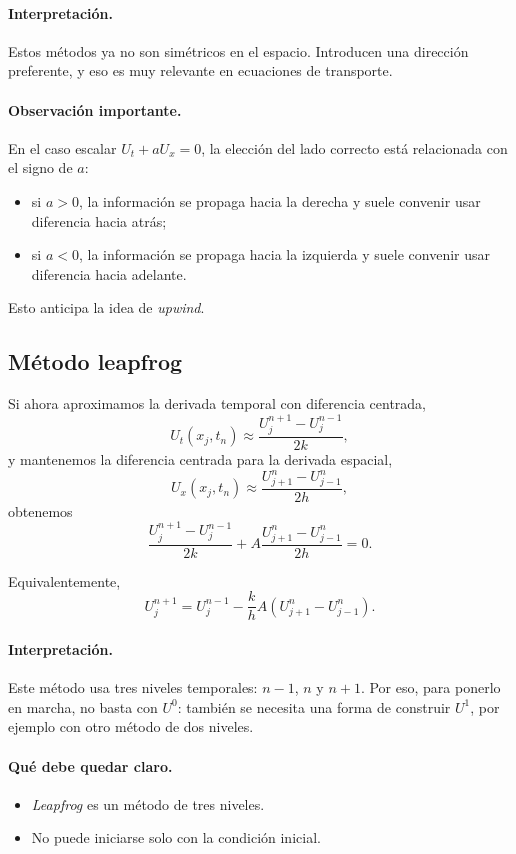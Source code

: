 \paragraph{Interpretación.}
Estos métodos ya no son simétricos en el espacio. Introducen una dirección preferente, y eso es muy relevante en ecuaciones de transporte.

\paragraph{Observación importante.}
En el caso escalar \(U_t+aU_x=0\), la elección del lado correcto está relacionada con el signo de \(a\):
\begin{itemize}
    \item si \(a>0\), la información se propaga hacia la derecha y suele convenir usar diferencia hacia atrás;
    \item si \(a<0\), la información se propaga hacia la izquierda y suele convenir usar diferencia hacia adelante.
\end{itemize}
Esto anticipa la idea de \emph{upwind}.

\subsection{Método leapfrog}

Si ahora aproximamos la derivada temporal con diferencia centrada,
\[
U_t(x_j,t_n)\approx \frac{U_j^{n+1}-U_j^{n-1}}{2k},
\]
y mantenemos la diferencia centrada para la derivada espacial,
\[
U_x(x_j,t_n)\approx \frac{U_{j+1}^n-U_{j-1}^n}{2h},
\]
obtenemos
\[
\frac{U_j^{n+1}-U_j^{n-1}}{2k}
+
A\frac{U_{j+1}^n-U_{j-1}^n}{2h}
=0.
\]

Equivalentemente,
\[
U_j^{n+1}
=
U_j^{n-1}
-
\frac{k}{h}A\left(U_{j+1}^n-U_{j-1}^n\right).
\]

\paragraph{Interpretación.}
Este método usa tres niveles temporales: \(n-1\), \(n\) y \(n+1\). Por eso, para ponerlo en marcha, no basta con \(U^0\): también se necesita una forma de construir \(U^1\), por ejemplo con otro método de dos niveles.

\paragraph{Qué debe quedar claro.}
\begin{itemize}
    \item \emph{Leapfrog} es un método de tres niveles.
    \item No puede iniciarse solo con la condición inicial.
\end{itemize}

